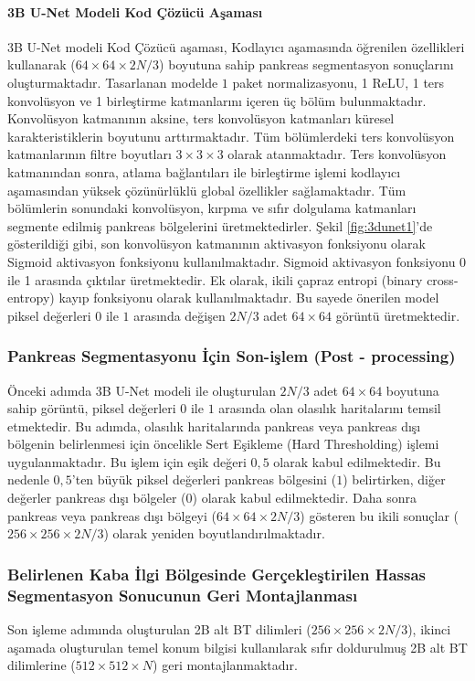 \paragraph{3B U-Net Modeli Kod Çözücü Aşaması}
3B U-Net modeli Kod Çözücü aşaması, Kodlayıcı aşamasında öğrenilen özellikleri kullanarak ($64 \times 64 \times 2N / 3$) boyutuna sahip pankreas segmentasyon sonuçlarını oluşturmaktadır. Tasarlanan modelde $1$ paket normalizasyonu, 1 ReLU, 1 ters konvolüsyon ve 1 birleştirme katmanlarını içeren üç bölüm bulunmaktadır. Konvolüsyon katmanının aksine, ters konvolüsyon katmanları küresel karakteristiklerin boyutunu arttırmaktadır. Tüm bölümlerdeki ters konvolüsyon katmanlarının filtre boyutları $3 \times 3 \times 3$ olarak atanmaktadır. Ters konvolüsyon katmanından sonra, atlama bağlantıları ile birleştirme işlemi kodlayıcı aşamasından yüksek çözünürlüklü global özellikler sağlamaktadır. Tüm bölümlerin sonundaki konvolüsyon, kırpma ve sıfır dolgulama katmanları segmente edilmiş pankreas bölgelerini üretmektedirler. Şekil \ref{fig:3dunet1}'de gösterildiği gibi, son konvolüsyon katmanının aktivasyon fonksiyonu olarak Sigmoid aktivasyon fonksiyonu kullanılmaktadır. Sigmoid aktivasyon fonksiyonu 0 ile 1 arasında çıktılar üretmektedir. Ek olarak, ikili çapraz entropi (binary cross-entropy) kayıp fonksiyonu olarak kullanılmaktadır. Bu sayede önerilen model piksel değerleri $0$ ile $1$ arasında değişen $2N/3$ adet $64 \times 64$ görüntü üretmektedir.

\subsubsection{Pankreas Segmentasyonu İçin Son-işlem (Post - processing)}
Önceki adımda 3B U-Net modeli ile oluşturulan $2N/3$ adet $64 \times 64$ boyutuna sahip görüntü, piksel değerleri $0$ ile $1$ arasında olan olasılık haritalarını temsil etmektedir. Bu adımda, olasılık haritalarında pankreas veya pankreas dışı bölgenin belirlenmesi için öncelikle Sert Eşikleme (Hard Thresholding) işlemi uygulanmaktadır. Bu işlem için eşik değeri $0,5$ olarak kabul edilmektedir. Bu nedenle $0,5$'ten büyük piksel değerleri pankreas bölgesini ($1$) belirtirken, diğer değerler pankreas dışı bölgeler ($0$) olarak kabul edilmektedir. Daha sonra pankreas veya pankreas dışı bölgeyi ($64 \times 64 \times 2N/3$) gösteren bu ikili sonuçlar ($256 \times 256 \times 2N/3$) olarak yeniden boyutlandırılmaktadır.

\subsubsection{Belirlenen Kaba İlgi Bölgesinde Gerçekleştirilen Hassas Segmentasyon Sonucunun Geri Montajlanması}
Son işleme adımında oluşturulan 2B alt BT dilimleri ($256 \times 256 \times 2N/3$), ikinci aşamada oluşturulan temel konum bilgisi kullanılarak sıfır doldurulmuş 2B alt BT dilimlerine ($512 \times 512 \times N$) geri montajlanmaktadır.


